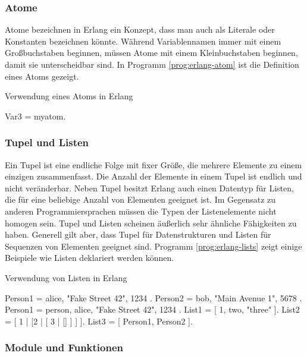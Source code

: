 \subsubsection{Atome}

Atome bezeichnen in Erlang ein Konzept, dass man auch als Literale oder Konstanten bezeichnen könnte. Während Variablennamen immer mit einem Großbuchstaben beginnen, müssen Atome mit einem Kleinbuchstaben beginnen, damit sie unterscheidbar sind. In Programm \ref{prog:erlang-atom} ist die Definition eines Atoms gezeigt.

\begin{program}[!hbt]
\caption{Verwendung eines Atoms in Erlang}
\label{prog:erlang-atom}
\begin{ErlangCode}
Var3 = myatom.
\end{ErlangCode}
\end{program}

\subsubsection{Tupel und Listen}

Ein Tupel ist eine endliche Folge mit fixer Größe, die mehrere Elemente zu einem einzigen zusammenfasst. Die Anzahl der Elemente in einem Tupel ist endlich und nicht veränderbar. Neben Tupel besitzt Erlang auch einen Datentyp für Listen, die für eine beliebige Anzahl von Elementen geeignet ist. Im Gegensatz zu anderen Programmiersprachen müssen die Typen der Listenelemente nicht homogen sein. Tupel und Listen scheinen äußerlich sehr ähnliche Fähigkeiten zu haben. Generell gilt aber, dass Tupel für Datenstrukturen und Listen für Sequenzen von Elementen geeignet sind. Programm \ref{prog:erlang-lists} zeigt einige Beispiele wie Listen deklariert werden können.

\begin{program}[!hbt]
\caption{Verwendung von Listen in Erlang}
\label{prog:erlang-lists}
\begin{ErlangCode}
Person1 = { alice, "Fake Street 42", 1234 }.
Person2 = { bob, "Main Avenue 1", 5678 }.
Person1 = { person, alice, "Fake Street 42", 1234 }. %
List1 = [ 1, two, "three" ].
List2 = [ 1 | [2 | [ 3 | [] ] ] ].
List3 = [ Person1, Person2 ].
\end{ErlangCode}
\end{program}

\subsubsection{Module und Funktionen}

